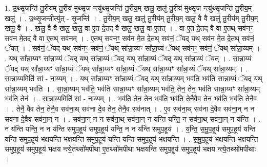 \documentclass[17pt]{extarticle}
\begin{document}
1. उ॒थ्सृ॒जन्ति॑ तु॒रीय॑म् तु॒रीय॑ मुथ्सृ॒ज न्त्यु॑थ्सृ॒जन्ति॑ तु॒रीय॒म् खलु॒ खलु॑ तु॒रीय॑ मुथ्सृ॒ज न्त्यु॑थ्सृ॒जन्ति॑ तु॒रीय॒म् खलु॑ । . उ॒थ्सृ॒जन्तीत्यु॑त् - सृ॒जन्ति॑ । . तु॒रीय॒म् खलु॒ खलु॑ तु॒रीय॑म् तु॒रीय॒म् खलु॒ वै वै खलु॑ तु॒रीय॑म् तु॒रीय॒म् खलु॒ वै । . खलु॒ वै वै खलु॒ खलु॒ वा ए॒त दे॒तद् वै खलु॒ खलु॒ वा ए॒तत् । . वा ए॒त दे॒तद् वै वा ए॒तथ् सव॑नꣳ॒॒ सव॑न मे॒तद् वै वा ए॒तथ् सव॑नम् । . ए॒तथ् सव॑नꣳ॒॒ सव॑न मे॒त दे॒तथ् सव॑नं॒ ॅयद् यथ् सव॑न मे॒त दे॒तथ् सव॑नं॒ ॅयत् । . सव॑नं॒ ॅयद् यथ् सव॑नꣳ॒॒ सव॑नं॒ ॅयथ् सा᳚न्ना॒य्यꣳ सा᳚न्ना॒य्यं ॅयथ् सव॑नꣳ॒॒ सव॑नं॒ ॅयथ् सा᳚न्ना॒य्यम् । . यथ् सा᳚न्ना॒य्यꣳ सा᳚न्ना॒य्यं ॅयद् यथ् सा᳚न्ना॒य्यं ॅयद् यथ् सा᳚न्ना॒य्यं ॅयद् यथ् सा᳚न्ना॒य्यं ॅयत् । . सा॒न्ना॒य्यं ॅयद् यथ् सा᳚न्ना॒य्यꣳ सा᳚न्ना॒य्यं ॅयथ् सा᳚न्ना॒य्यꣳ सा᳚न्ना॒य्यं ॅयथ् सा᳚न्ना॒य्यꣳ सा᳚न्ना॒य्यं ॅयथ् सा᳚न्ना॒य्यम् । . सा॒न्ना॒य्यमिति॑ सां - ना॒य्यम् । . यथ् सा᳚न्ना॒य्यꣳ सा᳚न्ना॒य्यं ॅयद् यथ् सा᳚न्ना॒य्यम् भव॑ति॒ भव॑ति सान्ना॒य्यं ॅयद् यथ् सा᳚न्ना॒य्यम् भव॑ति । . सा॒न्ना॒य्यम् भव॑ति॒ भव॑ति सान्ना॒य्यꣳ सा᳚न्ना॒य्यम् भव॑ति॒ तेन॒ तेन॒ भव॑ति सान्ना॒य्यꣳ सा᳚न्ना॒य्यम् भव॑ति॒ तेन॑ । . सा॒न्ना॒य्यमिति॑ सां - ना॒य्यम् । . भव॑ति॒ तेन॒ तेन॒ भव॑ति॒ भव॑ति॒ तेनै॒वैव तेन॒ भव॑ति॒ भव॑ति॒ तेनै॒व । . तेनै॒ वैव तेन॒ तेनै॒व सव॑ना॒थ् सव॑ना दे॒व तेन॒ तेनै॒व सव॑नात् । . ए॒व सव॑ना॒थ् सव॑ना दे॒वैव सव॑ना॒न् न न सव॑ना दे॒वैव सव॑ना॒न् न । . सव॑ना॒न् न न सव॑ना॒थ् सव॑ना॒न् न य॑न्ति यन्ति॒ न सव॑ना॒थ् सव॑ना॒न् न य॑न्ति । . न य॑न्ति यन्ति॒ न न य॑न्ति समुप॒हूय॑ समुप॒हूय॑ यन्ति॒ न न य॑न्ति समुप॒हूय॑ । . य॒न्ति॒ स॒मु॒प॒हूय॑ समुप॒हूय॑ यन्ति यन्ति समुप॒हूय॑ भक्षयन्ति भक्षयन्ति समुप॒हूय॑ यन्ति यन्ति समुप॒हूय॑ भक्षयन्ति । . स॒मु॒प॒हूय॑ भक्षयन्ति भक्षयन्ति समुप॒हूय॑ समुप॒हूय॑ भक्षय न्त्ये॒तथ्सो॑मपीथा ए॒तथ्सो॑मपीथा भक्षयन्ति समुप॒हूय॑ समुप॒हूय॑ भक्षय न्त्ये॒तथ्सो॑मपीथाः । \newline
\end{document}
